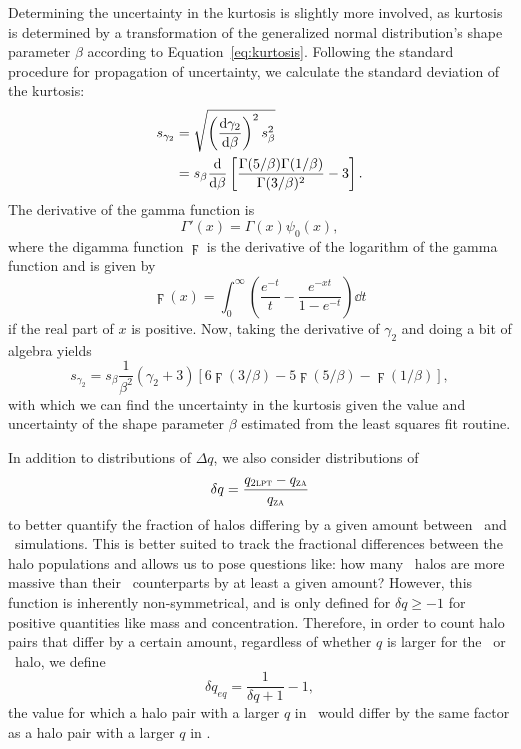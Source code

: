 Determining the uncertainty in the kurtosis is slightly more involved, as kurtosis is determined by a transformation of the generalized normal distribution's shape parameter $\beta$ according to Equation~\ref{eq:kurtosis}.  Following the standard procedure for propagation of uncertainty, we calculate the standard deviation of the kurtosis:
\begin{align} \label{eq:kurt_err_partial}
    s_{\gamma_{2}} &= \sqrt{ \left( \frac{{\rm {d}} \gamma_{2}}{{\rm {d}} \beta} \right)^{2} s_{\beta}^{2} } \\
        &= s_{\beta} \frac{{\rm {d}}}{{\rm {d}} \beta} \left[ \frac{\Gamma(5/\beta) \Gamma(1/\beta)}{\Gamma(3/\beta)^{2}} - 3 \right].
\end{align}
The derivative of the gamma function is
\begin{equation} \label{eq:gamma_prime}
    \Gamma'(x) = \Gamma(x) \psi_{0}(x),
\end{equation}
where the digamma function $\digamma$ is the derivative of the logarithm of the gamma function and is given by
\begin{equation} \label{eq:digamma}
    \digamma(x) = \int_{0}^{\infty} \left( \frac{e^{-t}}{t} - \frac{e^{-xt}}{1 - e^{-t}} \right) \dd t
\end{equation}
if the real part of $x$ is positive.  Now, taking the derivative of $\gamma_{2}$ and doing a bit of algebra yields
\begin{equation} \label{eq:kurt_err}
    s_{\gamma_{2}} = s_{\beta} \frac{1}{\beta^{2}} \left( \gamma_{2} + 3 \right) \left[ 6 \digamma(3/\beta) - 5 \digamma(5/\beta) - \digamma(1/\beta) \right],
\end{equation}
with which we can find the uncertainty in the kurtosis given the value and uncertainty of the shape parameter $\beta$ estimated from the least squares fit routine.

In addition to distributions of $\Delta q$, we also consider distributions of
\begin{equation} \label{eq:delta_prime_q}
	\delta q = \frac{q_{\textsc{2lpt}} - q_{\textsc{za}}}{q_{\textsc{za}}}
\end{equation}
to better quantify the fraction of halos differing by a given amount between \lpt\ and \za\ simulations.  This is better suited to track the fractional differences between the halo populations and allows us to pose questions like:  how many \lpt\ halos are more massive than their \za\ counterparts by at least a given amount?  However, this function is inherently non-symmetrical, and is only defined for $\delta q \geq -1$ for positive quantities like mass and concentration.  Therefore, in order to count halo pairs that differ by a certain amount, regardless of whether $q$ is larger for the \lpt\ or \za\ halo, we define
\begin{equation} \label{eq:equivalent_q_prime}
	\delta q_{eq} = \frac{1}{\delta q + 1} - 1,
\end{equation}
the value for which a halo pair with a larger $q$ in \za\ would differ by the same factor as a halo pair with a larger $q$ in \lpt.



